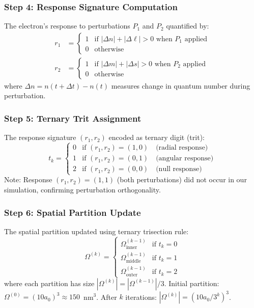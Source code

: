 \documentclass[twocolumn,10pt]{article}
\begin{document}
\subsubsection{Step 4: Response Signature Computation}

The electron's response to perturbations $P_1$ and $P_2$ quantified by:
%
\begin{align}
r_1 &= \begin{cases}
1 & \text{if } |\Delta n| + |\Delta \ell| > 0 \text{ when } P_1 \text{ applied} \\
0 & \text{otherwise}
\end{cases} \label{eq:r1} \\
r_2 &= \begin{cases}
1 & \text{if } |\Delta m| + |\Delta s| > 0 \text{ when } P_2 \text{ applied} \\
0 & \text{otherwise}
\end{cases} \label{eq:r2}
\end{align}
%
where $\Delta n = n(t + \Delta t) - n(t)$ measures change in quantum number 
during perturbation.

\subsubsection{Step 5: Ternary Trit Assignment}

The response signature $(r_1, r_2)$ encoded as ternary digit (trit):
%
\begin{equation}
t_k = \begin{cases}
0 & \text{if } (r_1, r_2) = (1, 0) \quad \text{(radial response)} \\
1 & \text{if } (r_1, r_2) = (0, 1) \quad \text{(angular response)} \\
2 & \text{if } (r_1, r_2) = (0, 0) \quad \text{(null response)}
\end{cases}
\label{eq:trit_assignment}
\end{equation}
%
Note: Response $(r_1, r_2) = (1, 1)$ (both perturbations) did not occur in our 
simulation, confirming perturbation orthogonality.

\subsubsection{Step 6: Spatial Partition Update}

The spatial partition updated using ternary trisection rule:
%
\begin{equation}
\Omega^{(k)} = \begin{cases}
\Omega^{(k-1)}_{\text{inner}} & \text{if } t_k = 0 \\
\Omega^{(k-1)}_{\text{middle}} & \text{if } t_k = 1 \\
\Omega^{(k-1)}_{\text{outer}} & \text{if } t_k = 2
\end{cases}
\label{eq:partition_update}
\end{equation}
%
where each partition has size $|\Omega^{(k)}| = |\Omega^{(k-1)}|/3$. Initial 
partition: $\Omega^{(0)} = (10a_0)^3 \approx 150$~nm$^3$. After $k$ iterations: 
$|\Omega^{(k)}| = (10a_0/3^k)^3$.
\end{document}
